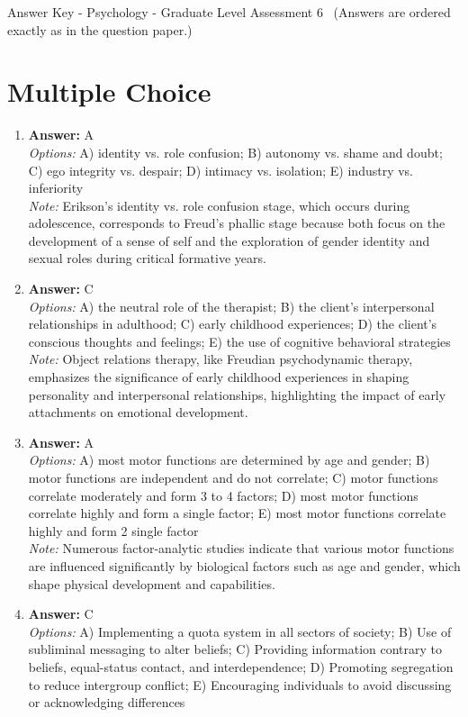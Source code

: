 \documentclass[12pt]{article}
\begin{document}
\begin{center}
Answer Key - Psychology - Graduate Level Assessment 6 \
\small (Answers are ordered exactly as in the question paper.)
\end{center}

\section*{Multiple Choice}
\begin{enumerate}[label=\arabic*.]
\item \textbf{Answer:} A
\\ \textit{Options:} A) identity vs. role confusion; B) autonomy vs. shame and doubt; C) ego integrity vs. despair; D) intimacy vs. isolation; E) industry vs. inferiority
\\ \textit{Note:} Erikson's identity vs. role confusion stage, which occurs during adolescence, corresponds to Freud's phallic stage because both focus on the development of a sense of self and the exploration of gender identity and sexual roles during critical formative years.
\item \textbf{Answer:} C
\\ \textit{Options:} A) the neutral role of the therapist; B) the client's interpersonal relationships in adulthood; C) early childhood experiences; D) the client's conscious thoughts and feelings; E) the use of cognitive behavioral strategies
\\ \textit{Note:} Object relations therapy, like Freudian psychodynamic therapy, emphasizes the significance of early childhood experiences in shaping personality and interpersonal relationships, highlighting the impact of early attachments on emotional development.
\item \textbf{Answer:} A
\\ \textit{Options:} A) most motor functions are determined by age and gender; B) motor functions are independent and do not correlate; C) motor functions correlate moderately and form 3 to 4 factors; D) most motor functions correlate highly and form a single factor; E) most motor functions correlate highly and form 2 single factor
\\ \textit{Note:} Numerous factor-analytic studies indicate that various motor functions are influenced significantly by biological factors such as age and gender, which shape physical development and capabilities.
\item \textbf{Answer:} C
\\ \textit{Options:} A) Implementing a quota system in all sectors of society; B) Use of subliminal messaging to alter beliefs; C) Providing information contrary to beliefs, equal-status contact, and interdependence; D) Promoting segregation to reduce intergroup conflict; E) Encouraging individuals to avoid discussing or acknowledging differences

\end{enumerate}
\end{document}
